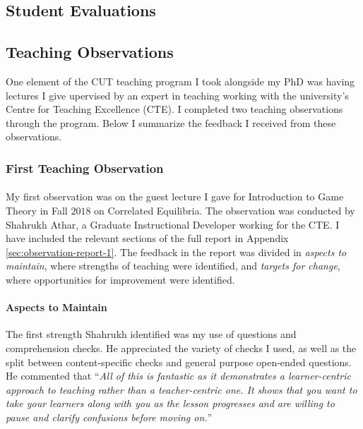 \documentclass{article}
\begin{document}
\subsection{Student Evaluations}
\subsection{Teaching Observations}\label{sec:teaching-observations}
One element of the CUT teaching program I took alongside my PhD was having lectures I give upervised by an expert in teaching working with the university's Centre for Teaching Excellence (CTE). I completed two teaching observations through the program. Below I summarize the feedback I received from these observations.
\subsubsection*{First Teaching Observation}
\paragraph{}
My first observation was on the guest lecture I gave for Introduction to Game Theory in Fall $2018$ on Correlated Equilibria. The observation was conducted by Shahrukh Athar, a Graduate Instructional Developer working for the CTE. I have included the relevant sections of the full report in Appendix \ref{sec:observation-report-1}. The feedback in the report was divided in \emph{aspects to maintain}, where strengths of teaching were identified, and \emph{targets for change}, where opportunities for improvement were identified.
\paragraph{Aspects to Maintain} The first strength Shahrukh identified was my use of questions and comprehension checks. He appreciated the variety of checks I used, as well as the split between content-specific checks and general purpose open-ended questions. He commented that ``\emph{All of this is
fantastic as it demonstrates a learner-centric approach to teaching rather than a teacher-centric
one. It shows that you want to take your learners along with you as the lesson progresses and
are willing to pause and clarify confusions before moving on.}'' 
\end{document}
